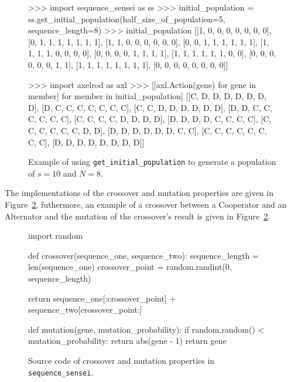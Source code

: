 \begin{figure}[!htbp]
    \begin{usagepy}
>>> import sequence_sensei as ss
>>> initial_population = ss.get_initial_population(half_size_of_population=5, sequence_length=8)
>>> initial_population
[[1, 0, 0, 0, 0, 0, 0, 0],
 [0, 1, 1, 1, 1, 1, 1, 1],
 [1, 1, 0, 0, 0, 0, 0, 0],
 [0, 0, 1, 1, 1, 1, 1, 1],
 [1, 1, 1, 1, 0, 0, 0, 0],
 [0, 0, 0, 0, 1, 1, 1, 1],
 [1, 1, 1, 1, 1, 1, 0, 0],
 [0, 0, 0, 0, 0, 0, 1, 1],
 [1, 1, 1, 1, 1, 1, 1, 1],
 [0, 0, 0, 0, 0, 0, 0, 0]]

 >>> import axelrod as axl
 >>> [[axl.Action(gene) for gene in member] for member in initial_population]
[[C, D, D, D, D, D, D, D],
 [D, C, C, C, C, C, C, C],
 [C, C, D, D, D, D, D, D],
 [D, D, C, C, C, C, C, C],
 [C, C, C, C, D, D, D, D],
 [D, D, D, D, C, C, C, C],
 [C, C, C, C, C, C, D, D],
 [D, D, D, D, D, D, C, C],
 [C, C, C, C, C, C, C, C],
 [D, D, D, D, D, D, D, D]]
    \end{usagepy}
    \caption{Example of using \texttt{get_initial_population} to
    generate a population of \(s=10\) and \(N=8\).}\label{fig:get_initial_population_example}
\end{figure}

The implementations of the crossover and mutation properties are given in Figure~\ref{fig:crossover_mutation},
futhermore, an example of a crossover between a Cooperator and an Alternator and the
mutation of the crossover's result is given in Figure~\ref{fig:crossover_mutation}.

\begin{figure}[!htbp]
\begin{sourcepy}
import random

def crossover(sequence_one, sequence_two):
    sequence_length = len(sequence_one)
    crossover_point = random.randint(0, sequence_length)

    return sequence_one[:crossover_point] + sequence_two[crossover_point:]

def mutation(gene, mutation_probability):
    if random.random() < mutation_probability:
        return abs(gene - 1)
    return gene
\end{sourcepy}
\caption{Source code of crossover and mutation properties in \texttt{sequence_sensei}.}\label{fig:crossover_mutation}
\end{figure}


